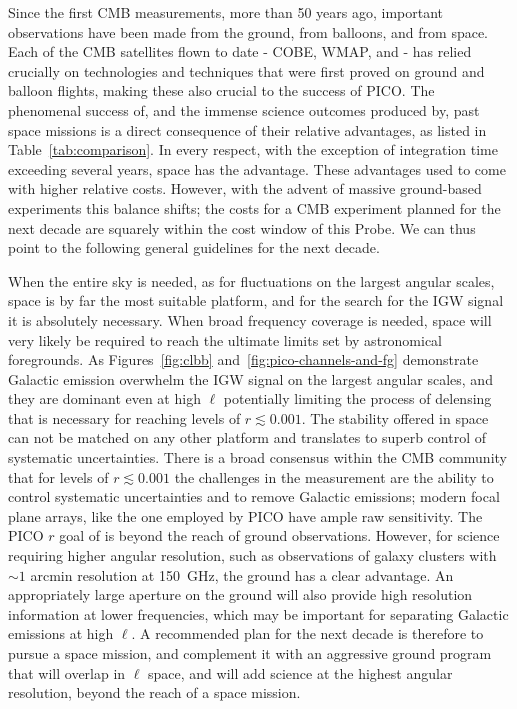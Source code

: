 \documentclass[PICOReport.tex]{subfiles}
\begin{document}
Since the first \ac{CMB} measurements, more than 50 years ago, important observations have been made from the ground, from balloons, and from space. Each of the CMB satellites flown to date - COBE, WMAP, and \planck - has relied crucially on technologies and techniques that were first proved on ground and balloon flights, making these also crucial to the success of PICO. The phenomenal success of, and the immense science outcomes produced by, past space missions is a direct consequence of their relative advantages, as listed in 
Table~\ref{tab:comparison}. In every respect, with the exception of integration time exceeding several years, space has the advantage. These advantages used to come with higher relative costs. However, with the advent of massive ground-based experiments this balance shifts; the costs for a CMB experiment planned for the next decade are squarely within the cost window of this Probe. We can thus point to the following general guidelines for the next decade. 

When the entire sky is needed, as for fluctuations on the largest angular scales, space is by far the most suitable platform, and for the search for the \ac{IGW} signal it is absolutely necessary. When broad frequency coverage is needed, space will very likely be required to reach the ultimate limits set by astronomical foregrounds.  As Figures~\ref{fig:clbb} and~\ref{fig:pico-channels-and-fg} demonstrate Galactic emission overwhelm the \ac{IGW} signal on the largest angular scales, and they are dominant even at high $\ell$ potentially limiting the process of delensing that is necessary for reaching levels of $r\lesssim0.001$. The stability offered in space can not be matched on any other platform and translates to superb control of systematic uncertainties. There is a broad consensus within the CMB community that for levels of $r \lesssim 0.001$ the challenges in the measurement are the ability to control systematic uncertainties and to remove Galactic emissions; modern focal plane arrays, like the one employed by PICO have ample raw sensitivity. The PICO $r$ goal of  is beyond the reach of ground observations.  However, for science requiring higher angular resolution, such as observations of galaxy clusters with $\sim1$ arcmin resolution at 150~GHz, the ground has a clear advantage. An appropriately large aperture on the ground will also provide high resolution information at lower frequencies, which may be important for separating Galactic emissions at high $\ell$. 
A recommended plan for the next decade is therefore to pursue a space mission, and complement it with an aggressive ground program that will overlap in $\ell$ space, and will add science at the highest angular resolution, beyond the reach of a space mission. 
\end{document}
